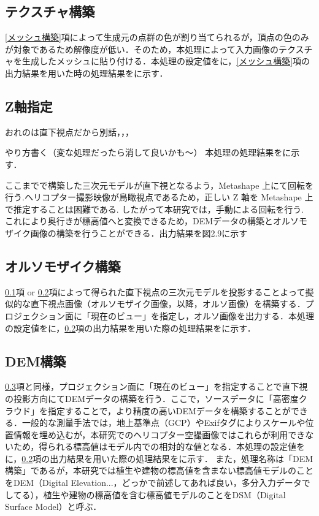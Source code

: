    \subsection{テクスチャ構築}
      \label{テクスチャ構築}
      \ref{メッシュ構築}項によって生成元の点群の色が割り当てられるが，頂点の色のみが対象であるため解像度が低い．そのため，本処理によって入力画像のテクスチャを生成したメッシュに貼り付ける．本処理の設定値を\fref{}に，\ref{メッシュ構築}項の出力結果を用いた時の処理結果を\fref{}に示す．

    \subsection{Z軸指定}
      \label{Z軸指定}
      おれのは直下視点だから別話，，，

      やり方書く（変な処理だったら消して良いかも〜）
      本処理の処理結果を\fref{}に示す．




      ここまでで構築した三次元モデルが直下視となるよう，Metashape 上にて回転を行う.ヘリコプター撮影映像が鳥瞰視点であるため，正しい Z 軸を Metashape 上で推定することは困難である. したがって本研究では，手動による回転を行う.
      これにより奥行きが標高値へと変換できるため，DEMデータの構築とオルソモザイク画像の構築を行うことができる．出力結果を図2.9に示す

    \subsection{オルソモザイク構築}
      \label{オルソモザイク構築}
      \ref{テクスチャ構築}項 or \ref{Z軸指定}項によって得られた直下視点の三次元モデルを投影することよって擬似的な直下視点画像（オルソモザイク画像，以降，オルソ画像）を構築する．プロジェクション面に「現在のビュー」を指定し，オルソ画像を出力する．本処理の設定値を\fref{}に，\ref{Z軸指定}項の出力結果を用いた際の処理結果を\fref{}に示す．
      
    \subsection{DEM構築}
      \label{DEM構築}
      \ref{オルソモザイク構築}項と同様，プロジェクション面に「現在のビュー」を指定することで直下視の投影方向にてDEMデータの構築を行う．ここで，ソースデータに「高密度クラウド」を指定することで，より精度の高いDEMデータを構築することができる．一般的な測量手法では，地上基準点（GCP）やExifタグによりスケールや位置情報を埋め込むが，本研究でのヘリコプター空撮画像ではこれらが利用できないため，得られる標高値はモデル内での相対的な値となる．本処理の設定値を\fref{}に，\ref{Z軸指定}項の出力結果を用いた際の処理結果を\fref{}に示す．
      また，処理名称は「DEM構築」であるが，本研究では植生や建物の標高値を含まない標高値モデルのことをDEM（Digital Elevation...，どっかで前述してあれば良い，多分入力データでしてる），植生や建物の標高値を含む標高値モデルのことをDSM（Digital Surface Model）と呼ぶ．


